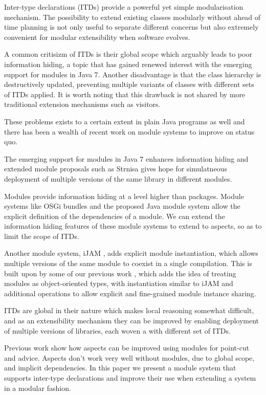 Inter-type declarations (ITDs) provide a powerful yet simple modularisation
mechanism. The possibility to extend existing classes modularly without
ahead of time planning is not only useful to separate different concerns
but also extremely convenient for modular extensibility when software
evolves.

A common critisizm of ITDs is their global scope which arguably leads to
poor information hiding, a topic that has gained renewed interest with the 
emerging support for modules in Java 7. Another disadvantage is that the 
class hierarchy is destructively updated, preventing multiple variants of 
classes with different sets of ITDs applied. It is worth noting that 
this drawback is not shared by more traditional extension mechanisms such 
as visitors.

These problems exists to a certain extent in plain Java programs as well
and there has been a wealth of recent work on module systems to improve on
status quo. 

The emerging support for modules in Java 7 enhances information hiding and
extended module proposals such as Strnisa gives hope for simulatneous
deployment of multiple versions of the same library in different modules.

Modules provide information hiding at a level higher than packages. Module
systems like OSGi bundles\cite{OSGi4} and the proposed Java module system\cite{JSR277}
allow the explicit definition of the dependencies of a module. We can extend
the information hiding features of these module systems to extend to aspects, 
so as to limit the scope of ITDs.

Another module system, iJAM \cite{iJAM}, adds explicit module instantiation, 
which allows multiple versions of the same module to coexist in a single compilation.
This is built upon by some of our previous work \cite{modulesastypes}, which 
adds the idea of treating modules as object-oriented types, with instantiation
similar to iJAM and additional operations to allow explicit and fine-grained
module instance sharing. 

ITDs are global in their nature which makes local
reasoning somewhat difficult, and as an extensibility mechanism they can be
improved by enabling deployment of multiple versions of libraries, 
each woven a with different set of ITDs.


Previous work show how aspects can be improved using modules for point-cut
and advice.
Aspects don't work very well without modules, due to global scope, and
implicit dependencies.
In this paper we present a module system that supports inter-type
declarations and improve their use when extending a system in a modular
fashion.

